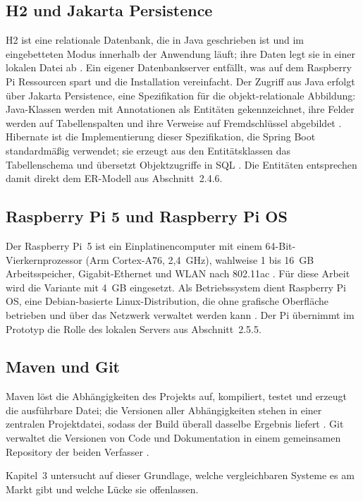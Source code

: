 \documentclass[12pt,a4paper]{scrreprt}
\begin{document}
\subsection{H2 und Jakarta Persistence}
H2 ist eine relationale Datenbank, die in Java geschrieben ist und im eingebetteten Modus innerhalb der Anwendung läuft; ihre Daten legt sie in einer lokalen Datei ab \cite{h2db}. Ein eigener Datenbankserver entfällt, was auf dem Raspberry Pi Ressourcen spart und die Installation vereinfacht. Der Zugriff aus Java erfolgt über Jakarta Persistence, eine Spezifikation für die objekt-relationale Abbildung: Java-Klassen werden mit Annotationen als Entitäten gekennzeichnet, ihre Felder werden auf Tabellenspalten und ihre Verweise auf Fremdschlüssel abgebildet \cite{jakartapersistence}. Hibernate ist die Implementierung dieser Spezifikation, die Spring Boot standardmäßig verwendet; sie erzeugt aus den Entitätsklassen das Tabellenschema und übersetzt Objektzugriffe in SQL \cite{hibernate}. Die Entitäten entsprechen damit direkt dem ER-Modell aus Abschnitt~2.4.6.

\subsection{Raspberry Pi 5 und Raspberry Pi OS}
Der Raspberry Pi~5 ist ein Einplatinencomputer mit einem 64-Bit-Vierkernprozessor (Arm Cortex-A76, 2,4~GHz), wahlweise 1 bis 16~GB Arbeitsspeicher, Gigabit-Ethernet und WLAN nach 802.11ac \cite{raspberrypi5}. Für diese Arbeit wird die Variante mit 4~GB eingesetzt. Als Betriebssystem dient Raspberry Pi OS, eine Debian-basierte Linux-Distribution, die ohne grafische Oberfläche betrieben und über das Netzwerk verwaltet werden kann \cite{piremote}. Der Pi übernimmt im Prototyp die Rolle des lokalen Servers aus Abschnitt~2.5.5.

\subsection{Maven und Git}
Maven löst die Abhängigkeiten des Projekts auf, kompiliert, testet und erzeugt die ausführbare Datei; die Versionen aller Abhängigkeiten stehen in einer zentralen Projektdatei, sodass der Build überall dasselbe Ergebnis liefert \cite{maven}. Git verwaltet die Versionen von Code und Dokumentation in einem gemeinsamen Repository der beiden Verfasser \cite{git}.

Kapitel~3 untersucht auf dieser Grundlage, welche vergleichbaren Systeme es am Markt gibt und welche Lücke sie offenlassen.
\end{document}
